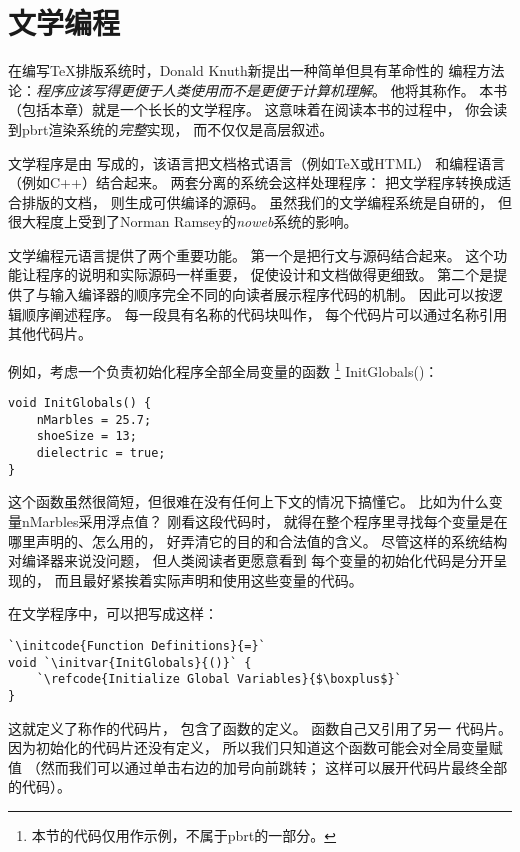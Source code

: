 \section{文学编程}\label{sec:文学编程}

在编写\TeX 排版系统时，Donald Knuth新提出一种简单但具有革命性的
编程方法论：\emph{程序应该写得更便于人类使用而不是更便于计算机理解}。
他将其称作。
本书（包括本章）就是一个长长的文学程序。
这意味着在阅读本书的过程中，
你会读到pbrt渲染系统的\emph{完整}实现，
而不仅仅是高层叙述。

文学程序是由
写成的，该语言把文档格式语言（例如\TeX 或HTML）
和编程语言（例如C++）结合起来。
两套分离的系统会这样处理程序：
把文学程序转换成适合排版的文档，
则生成可供编译的源码。
虽然我们的文学编程系统是自研的，
但很大程度上受到了Norman Ramsey的\emph{noweb}系统的影响。

文学编程元语言提供了两个重要功能。
第一个是把行文与源码结合起来。
这个功能让程序的说明和实际源码一样重要，
促使设计和文档做得更细致。
第二个是提供了与输入编译器的顺序完全不同的向读者展示程序代码的机制。
因此可以按逻辑顺序阐述程序。
每一段具有名称的代码块叫作，
每个代码片可以通过名称引用其他代码片。

例如，考虑一个负责初始化程序全部全局变量的函数
\footnote{本节的代码仅用作示例，不属于pbrt的一部分。}
{\ttfamily InitGlobals()}：
\begin{lstlisting}
void InitGlobals() {
    nMarbles = 25.7;
    shoeSize = 13;
    dielectric = true;
}
\end{lstlisting}

这个函数虽然很简短，但很难在没有任何上下文的情况下搞懂它。
比如为什么变量{\ttfamily nMarbles}采用浮点值？
刚看这段代码时，
就得在整个程序里寻找每个变量是在哪里声明的、怎么用的，
好弄清它的目的和合法值的含义。
尽管这样的系统结构对编译器来说没问题，
但人类阅读者更愿意看到
每个变量的初始化代码是分开呈现的，
而且最好紧挨着实际声明和使用这些变量的代码。

在文学程序中，可以把写成这样：
\begin{lstlisting}
`\initcode{Function Definitions}{=}`
void `\initvar{InitGlobals}{()}` {
    `\refcode{Initialize Global Variables}{$\boxplus$}`
}
\end{lstlisting}

这就定义了称作的代码片，
包含了函数的定义。
函数自己又引用了另一
代码片。
因为初始化的代码片还没有定义，
所以我们只知道这个函数可能会对全局变量赋值
（然而我们可以通过单击右边的加号向前跳转；
这样可以展开代码片最终全部的代码）。

